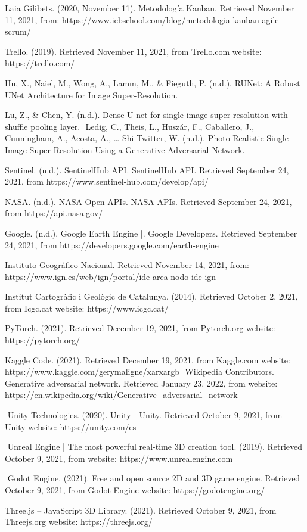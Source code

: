 ﻿\documentclass[10pt,a4paper,twocolumn,twoside]{article}
\begin{document}
\begin{thebibliography}{15}
Laia Gilibets. (2020, November 11). Metodología Kanban. Retrieved November 11, 2021, from: https://www.iebschool.com/blog/metodologia-kanban-agile-scrum/

Trello. (2019). Retrieved November 11, 2021, from Trello.com website: https://trello.com/

Hu, X., Naiel, M., Wong, A., Lamm, M., \& Fieguth, P. (n.d.). RUNet: A Robust UNet Architecture for Image Super-Resolution.

Lu, Z., \& Chen, Y. (n.d.). Dense U-net for single image super-resolution with shuffle pooling layer.
‌
Ledig, C., Theis, L., Huszár, F., Caballero, J., Cunningham, A., Acosta, A., … Shi Twitter, W. (n.d.). Photo-Realistic Single Image Super-Resolution Using a Generative Adversarial Network.

Sentinel. (n.d.). SentinelHub API. SentinelHub API. Retrieved September 24, 2021, from https://www.sentinel-hub.com/develop/api/

NASA. (n.d.). NASA Open APIs. NASA APIs. Retrieved September 24, 2021, from https://api.nasa.gov/

Google. (n.d.). Google Earth Engine |. Google Developers. Retrieved September 24, 2021, from https://developers.google.com/earth-engine

 Instituto Geográfico Nacional. Retrieved November 14, 2021, from: https://www.ign.es/web/ign/portal/ide-area-nodo-ide-ign

Institut Cartogràfic i Geològic de Catalunya. (2014). Retrieved October 2, 2021, from Icgc.cat website: https://www.icgc.cat/

PyTorch. (2021). Retrieved December 19, 2021, from Pytorch.org website: https://pytorch.org/

Kaggle Code. (2021). Retrieved December 19, 2021, from Kaggle.com website: https://www.kaggle.com/gerymaligne/xarxargb
‌
Wikipedia Contributors. Generative adversarial network. Retrieved January 23, 2022, from website: https://en.wikipedia.org/wiki/Generative\_adversarial\_network

‌
Unity Technologies. (2020). Unity - Unity. Retrieved October 9, 2021, from Unity website: https://unity.com/es

‌
Unreal Engine | The most powerful real-time 3D creation tool. (2019). Retrieved October 9, 2021, from website: https://www.unrealengine.com

‌
Godot Engine. (2021). Free and open source 2D and 3D game engine. Retrieved October 9, 2021, from Godot Engine website: https://godotengine.org/

Three.js – JavaScript 3D Library. (2021). Retrieved October 9, 2021, from Threejs.org website: https://threejs.org/
‌
‌
\end{thebibliography}
\end{document}
